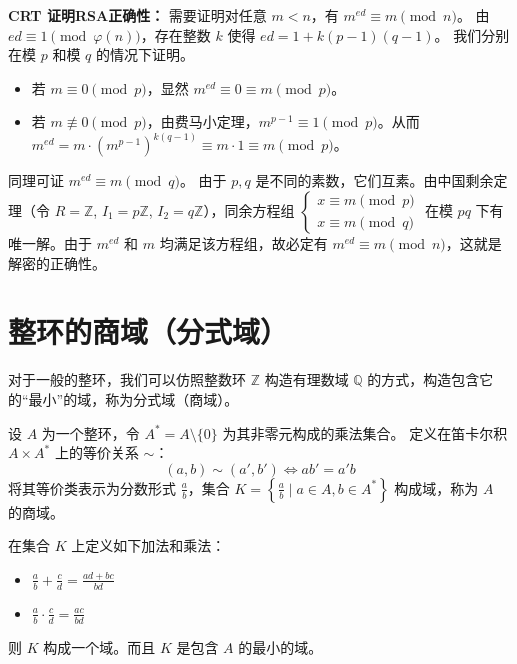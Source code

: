 \documentclass[11pt]{article}
\begin{document}
\textbf{CRT 证明RSA正确性：}
需要证明对任意 $m < n$，有 $m^{ed} \equiv m \pmod{n}$。
由 $ed \equiv 1 \pmod{\varphi(n)}$，存在整数 $k$ 使得 $ed = 1 + k(p-1)(q-1)$。
我们分别在模 $p$ 和模 $q$ 的情况下证明。
\begin{itemize}
    \item 若 $m \equiv 0 \pmod{p}$，显然 $m^{ed} \equiv 0 \equiv m \pmod{p}$。
    \item 若 $m \not\equiv 0 \pmod{p}$，由费马小定理，$m^{p-1} \equiv 1 \pmod{p}$。从而 $m^{ed} = m \cdot (m^{p-1})^{k(q-1)} \equiv m \cdot 1 \equiv m \pmod{p}$。
\end{itemize}
同理可证 $m^{ed} \equiv m \pmod{q}$。
由于 $p, q$ 是不同的素数，它们互素。由中国剩余定理（令 $R=\mathbb{Z}$, $I_1=p\mathbb{Z}$, $I_2=q\mathbb{Z}$），同余方程组 
$\begin{cases} x \equiv m \pmod p \\ x \equiv m \pmod q \end{cases}$ 
在模 $pq$ 下有唯一解。由于 $m^{ed}$ 和 $m$ 均满足该方程组，故必定有 $m^{ed} \equiv m \pmod{n}$，这就是解密的正确性。

\section{整环的商域（分式域）}
对于一般的整环，我们可以仿照整数环 $\mathbb{Z}$ 构造有理数域 $\mathbb{Q}$ 的方式，构造包含它的“最小”的域，称为分式域（商域）。

\begin{cndefinition}[商域 / 分式域]
设 $A$ 为一个整环，令 $A^* = A \setminus \{0\}$ 为其非零元构成的乘法集合。
定义在笛卡尔积 $A \times A^*$ 上的等价关系 $\sim$：
$$ (a, b) \sim (a', b') \iff a b' = a' b $$
将其等价类表示为分数形式 $\frac{a}{b}$，集合 $K = \left\{ \frac{a}{b} \mid a \in A, b \in A^* \right\}$ 构成域，称为 $A$ 的商域。
\end{cndefinition}

\begin{cntheorem}
在集合 $K$ 上定义如下加法和乘法：
\begin{itemize}
    \item $\frac{a}{b} + \frac{c}{d} = \frac{ad + bc}{bd}$
    \item $\frac{a}{b} \cdot \frac{c}{d} = \frac{ac}{bd}$
\end{itemize}
则 $K$ 构成一个域。而且 $K$ 是包含 $A$ 的最小的域。
\end{cntheorem}
\end{document}
